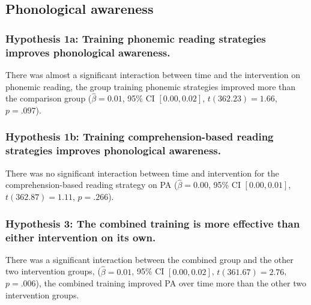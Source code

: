 \documentclass[
  english,
  ,man]{apa6}
\begin{document}
\hypertarget{phonological-awareness}{%
\subsection{Phonological awareness}\label{phonological-awareness}}

\hypertarget{hypothesis-1a-training-phonemic-reading-strategies-improves-phonological-awareness.}{%
\subsubsection{Hypothesis 1a: Training phonemic reading strategies improves phonological awareness.}\label{hypothesis-1a-training-phonemic-reading-strategies-improves-phonological-awareness.}}

There was almost a significant interaction between time and the intervention on phonemic reading, the group training phonemic strategies improved more than the comparison group (\(\hat{\beta} = 0.01\), 95\% CI \([0.00, 0.02]\), \(t(362.23) = 1.66\), \(p = .097\)).

\hypertarget{hypothesis-1b-training-comprehension-based-reading-strategies-improves-phonological-awareness.}{%
\subsubsection{Hypothesis 1b: Training comprehension-based reading strategies improves phonological awareness.}\label{hypothesis-1b-training-comprehension-based-reading-strategies-improves-phonological-awareness.}}

There was no significant interaction between time and intervention for the comprehension-based reading strategy on PA (\(\hat{\beta} = 0.00\), 95\% CI \([0.00, 0.01]\), \(t(362.87) = 1.11\), \(p = .266\)).

\hypertarget{hypothesis-3-the-combined-training-is-more-effective-than-either-intervention-on-its-own.}{%
\subsubsection{Hypothesis 3: The combined training is more effective than either intervention on its own.}\label{hypothesis-3-the-combined-training-is-more-effective-than-either-intervention-on-its-own.}}

There was a significant interaction between the combined group and the other two intervention groups, (\(\hat{\beta} = 0.01\), 95\% CI \([0.00, 0.02]\), \(t(361.67) = 2.76\), \(p = .006\)), the combined training improved PA over time more than the other two intervention groups.
\end{document}
